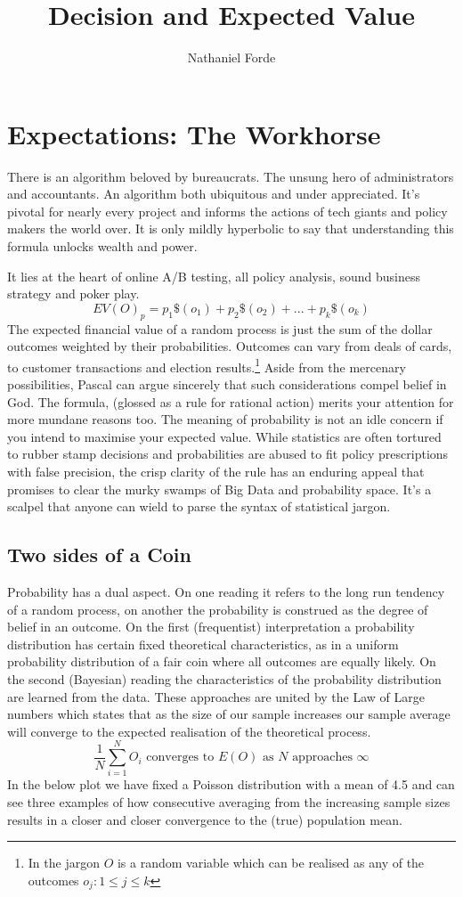 \documentclass[10pt,a4paper,notitlepage, twocolumn]{article}
\author{Nathaniel Forde}
\title{Decision and Expected Value}
\begin{document}
\section*{Expectations: The Workhorse}
There is an algorithm beloved by bureaucrats. The unsung hero of administrators and accountants. An algorithm both ubiquitous and under appreciated. It's pivotal for nearly every project and informs the actions of tech giants and policy makers the world over. It is only mildly hyperbolic to say that understanding this formula unlocks wealth and power. 

It lies at the heart of online A/B testing, all policy analysis, sound business strategy and poker play. 
$$ EV(O)_{p} = p_{1}\$(o_{1}) + p_{2}\$(o_{2}) + ... + p_{k}\$(o_{k}) $$
The expected financial value of a random process is just the sum of the dollar outcomes weighted by their probabilities. 
Outcomes can vary from deals of cards, to customer transactions and election results.\footnote{In the jargon $O$ is a random variable which can be realised as any of the outcomes  $ o_{j} :  1 \leq j \leq k$} Aside from the mercenary possibilities, Pascal can argue sincerely that such considerations compel belief in God. The formula, (glossed as a rule for rational action) merits your attention for more mundane reasons too. The meaning of probability is not an idle concern if you intend to maximise your expected value. While statistics are often tortured to rubber stamp decisions and probabilities are abused to fit policy prescriptions with false precision, the crisp clarity of the rule has an enduring appeal that promises to clear the murky swamps of Big Data and probability space. It's a scalpel that anyone can wield to parse the syntax of statistical jargon. 

\subsection*{Two sides of a Coin}
Probability has a dual aspect. On one reading it refers to the long run tendency of a random process, on another the probability is construed as the degree of belief in an outcome. On the first (frequentist) interpretation a probability distribution has certain fixed theoretical characteristics, as in a uniform probability distribution of a fair coin where all outcomes are equally likely. On the second (Bayesian) reading the characteristics of the probability distribution are learned from the data. These approaches are united by the Law of Large numbers which states that as the size of our sample increases our sample average will converge to the expected realisation of the theoretical process.
$$  \frac{1}{N} \sum_{i = 1}^{N} O_{i} \text{ converges to }  E(O) \text{ as } N \text{ approaches } \infty $$ 
In the below plot we have fixed a Poisson distribution with a mean of 4.5 and can see three examples of how consecutive averaging from the increasing sample sizes results in a closer and closer convergence to the (true) population mean.
\end{document}
